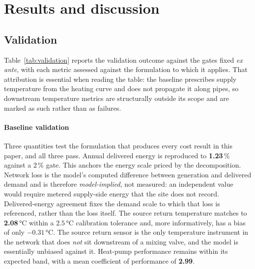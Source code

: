 \documentclass[a4paper,fleqn]{cas-sc}
\begin{document}
\section{Results and discussion}
\label{sec:results}

\subsection{Validation}\label{subsec:validation}

Table~\ref{tab:validation} reports the validation outcome against the gates fixed
\emph{ex ante}, with each metric assessed against the formulation to which it applies. That
attribution is essential when reading the table: the baseline prescribes supply temperature
from the heating curve and does not propagate it along pipes, so downstream temperature
metrics are structurally outside its scope and are marked as such rather than as failures.

\paragraph{Baseline validation}
Three quantities test the formulation that produces every cost result in this paper, and all
three pass. Annual delivered energy is reproduced to \textbf{1.23}\,\% against a \(2\,\%\)
gate. This anchors the energy scale priced by the decomposition. Network loss is the model's
computed difference between generation and delivered demand and is therefore
\emph{model-implied}, not measured: an independent value would require metered supply-side
energy that the site does not record. Delivered-energy agreement fixes the demand scale to
which that loss is referenced, rather than the loss itself.
The source return temperature matches to \textbf{2.08}\,°C within a \(2.5\)\,°C calibration
tolerance and,
more informatively, has a bias of only \(-0.31\)\,°C. The source return sensor is the only
temperature instrument in the network that does \emph{not} sit downstream of a mixing valve,
and the model is essentially unbiased against it. Heat-pump performance remains within its
expected band, with a mean coefficient of performance of \textbf{2.99}.
\end{document}

